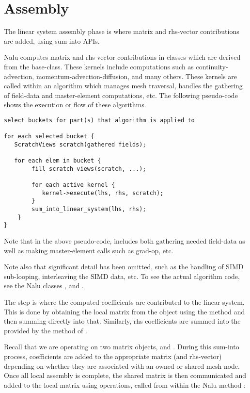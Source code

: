
\chapter{Assembly}
The linear system assembly phase is where matrix and rhs-vector contributions
are added, using sum-into APIs.

Nalu computes matrix and rhs-vector contributions in classes which are derived
from the  base-class. These kernels include computations such as
continuity-advection, momentum-advection-diffusion, and many others. These kernels
are called within an algorithm which manages mesh traversal, handles the gathering
of field-data and master-element computations, etc. The following pseudo-code shows
the execution or flow of these algorithms.

\begin{verbatim}
select buckets for part(s) that algorithm is applied to

for each selected bucket {
   ScratchViews scratch(gathered fields);

   for each elem in bucket {
        fill_scratch_views(scratch, ...);

        for each active kernel {
           kernel->execute(lhs, rhs, scratch);
        }
        sum_into_linear_system(lhs, rhs);
    }
}
\end{verbatim}

Note that in the above pseudo-code,  includes both
gathering needed field-data as well as making master-element calls such
as grad-op, etc.

Note also that significant detail has been omitted, such as the handling of
SIMD sub-looping, interleaving the SIMD data, etc.  To see the actual algorithm code,
see the Nalu classes ,
and .

The  step is where the computed coefficients are
contributed to the linear-system. This is done by obtaining the local matrix from the
 object using the method  and then
summing directly into that. Similarly, rhs coefficients are summed into the 
provided by the  method of .

Recall that we are operating on two matrix objects,  and
. During this sum-into process, coefficients are added
to the appropriate matrix (and rhs-vector) depending on whether they are associated
with an owned or shared mesh node. Once all local assembly is complete, the shared matrix
is then communicated and added to the local matrix using  operations, called
from within the Nalu method :

